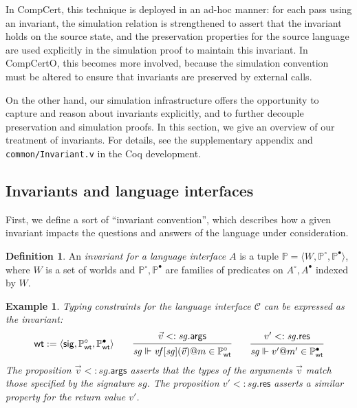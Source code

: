 \documentclass[draft,11pt]{report}
\newtheorem{example}[theorem]{Example}
\theoremstyle{definition}
\newtheorem{definition}[theorem]{Definition}
\newcommand{\kw}[1]{\ensuremath{ \mathsf{#1} }}
\newcommand{\que}{\circ}         %
\newcommand{\ans}{\bullet}       %
\begin{document}
In CompCert,
this technique is deployed in an ad-hoc manner:
for each pass using an invariant,
the simulation relation is strengthened to assert that
the invariant holds on the source state,
and the preservation properties for the source language
are used explicitly in the simulation proof
to maintain this invariant.
In CompCertO,
this becomes more involved,
because the simulation convention must be altered
to ensure that invariants are preserved
by external calls.

On the other hand,
our simulation infrastructure offers the opportunity
to capture and reason about invariants explicitly,
and to further decouple preservation and simulation proofs.
In this section,
we give an overview of our treatment of invariants.
For details,
see the supplementary appendix and
\texttt{common/Invariant.v}
in the Coq development.


\subsection{Invariants and language interfaces} %

First, we define a sort of ``invariant convention'',
which describes how a given invariant impacts the questions and answers
of the language under consideration.

\begin{definition} %
An \emph{invariant for a language interface} $A$
is a tuple
$\mathbb{P} = \langle W, \mathbb{P}^\que, \mathbb{P}^\ans \rangle$,
where $W$ is a set of worlds
and $\mathbb{P}^\que, \mathbb{P}^\ans$
are families of predicates on $A^\que, A^\ans$
indexed by $W$.
\end{definition}

\begin{example} \label{ex:wt} %
Typing constraints for the language interface $\mathcal{C}$
can be expressed as the invariant:
\[
  \kw{wt} :=
    \langle
      \kw{sig},
      \mathbb{P}_\kw{wt}^\que,
      \mathbb{P}_\kw{wt}^\ans
    \rangle
  \qquad
  \begin{prooftree}
    \hypo{\vec{v} <: \mathit{sg}.\kw{args}}
    \infer1{\mathit{sg} \Vdash
      \mathit{vf}[\mathit{sg}](\vec{v})@m \in \mathbb{P}_\kw{wt}^\que}
  \end{prooftree}
  \qquad
  \begin{prooftree}
    \hypo{v' <: \mathit{sg}.\kw{res}}
    \infer1{\mathit{sg} \Vdash
      v'@m' \in \mathbb{P}_\kw{wt}^\ans}
  \end{prooftree}
\]
The proposition $\vec{v} <: \mathit{sg}.\kw{args}$
asserts that the types of the arguments $\vec{v}$
match those specified by the signature $\mathit{sg}$.
The proposition $v' <: \mathit{sg}.\kw{res}$
asserts a similar property for the return value $v'$.
\end{example}
\end{document}
